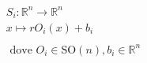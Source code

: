 \documentclass[preview]{standalone}
\begin{document}
\begin{align*}
S_i : \mathbb{R}^n \to \mathbb{R}^n \\ x \mapsto r O_i(x) + b_i \\\\ \text{ dove } O_i \in \text{SO}(n), b_i \in \mathbb{R}^n
\end{align*}
\end{document}
